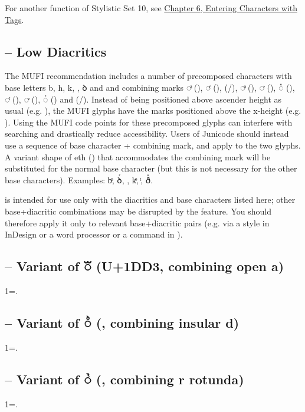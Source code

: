 \noindent For another function of Stylistic Set 10, see \hyperlink{tagchapter}{Chapter 6, Entering Characters with Tags}.

\subsection{ -- Low Diacritics}
The MUFI recommendation includes a number of precomposed characters with base letters b, h, k, {\th}, ꝺ and {\dh}
and combining marks ◌ͣ (), ◌ͤ (), 
(\slash{}), ◌ͦ (), ◌ͬ (), ◌ᷢ (),
◌ͭ (), ◌ͮ (), ◌ᷦ () and 
(/). Instead of being positioned above ascender height as usual (e.g.
), the MUFI glyphs have the marks positioned above the x-height
(e.g. ).
Using the MUFI code points for these precomposed glyphs can interfere with searching
and drastically reduce accessibility. Users of Junicode should instead use a sequence of base character + combining
mark, and apply  to the two glyphs. A variant shape of eth (\textex{{\dh}})
that accommodates the combining mark will be substituted for the normal base character (but this is not necessary for
the other base characters). Examples:
{bͦ, ꝺᷦ, , kͤ, {\th}ͭ, ðᷢ}.

 is intended for use only with the diacritics and base characters listed here; other
base+diacritic combinations may be disrupted by the feature. You should therefore apply it only to
relevant base+diacritic pairs (e.g. via a style in InDesign or a word processor or a command in
{\LuaTeX}).

\subsection{ -- Variant of ◌ᷓ (U+1DD3, combining open a)}
1=.

\subsection{ -- Variant of ◌ᷘ (, combining insular
d)}
1=.

\subsection{ -- Variant of ◌ᷣ (, combining r rotunda)}
1=.

